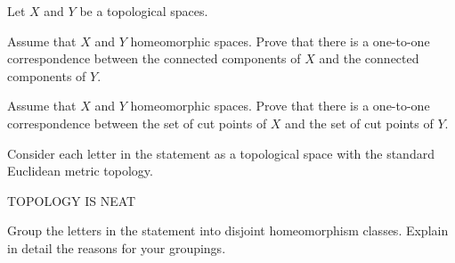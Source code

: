 \item Let $X$ and $Y$ be a topological spaces.
\ba
\item Assume that $X$ and $Y$ homeomorphic spaces. Prove that there is a one-to-one correspondence between the connected components of $X$ and the connected components of $Y$. 

\item Assume that $X$ and $Y$ homeomorphic spaces. Prove that there is a one-to-one correspondence between the set of cut points of $X$ and the set of cut points of $Y$. 

\item Consider each letter in the statement as a topological space with the standard Euclidean metric topology.
\begin{center} {\selectfont TOPOLOGY IS NEAT} \end{center}
Group the letters in the statement into disjoint homeomorphism classes. Explain in detail the reasons for your groupings. 
\ea

